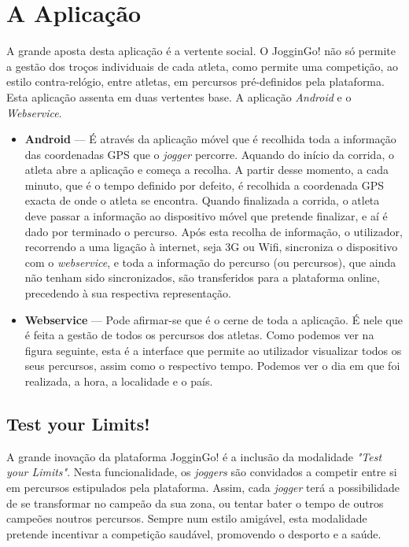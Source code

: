 \documentclass[twocolumn,twoside,10pt,a4paper]{article}
\begin{document}
\section{A Aplicação}\label{sec:application}

A grande aposta desta aplicação é a vertente social. O JogginGo! não só permite a gestão dos troços individuais de cada atleta, como permite uma competição, ao estilo contra-relógio, entre atletas, em percursos pré-definidos pela plataforma.
Esta aplicação assenta em duas vertentes base. A aplicação \textit{Android} e o \textit{Webservice}.
\begin{itemize}
\item \textbf{Android} --- É através da aplicação móvel que é recolhida toda a informação das coordenadas GPS que o \textit{jogger} percorre. Aquando do início da corrida, o atleta abre a aplicação e começa a recolha. A partir desse momento, a cada minuto, que é o tempo definido por defeito, é recolhida a coordenada GPS exacta de onde o atleta se encontra. Quando finalizada a corrida, o atleta deve passar a informação ao dispositivo móvel que pretende finalizar, e aí é dado por terminado o percurso. Após esta recolha de informação, o utilizador, recorrendo a uma ligação à internet, seja 3G ou Wifi, sincroniza o dispositivo com o \textit{webservice}, e toda a informação do percurso (ou percursos), que ainda não tenham sido sincronizados, são transferidos para a plataforma online, precedendo à sua respectiva representação.
\item \textbf{Webservice} --- Pode afirmar-se que é o cerne de toda a aplicação. É nele que é feita a gestão de todos os percursos dos atletas. Como podemos ver na figura seguinte, esta é a interface que permite ao utilizador visualizar todos os seus percursos, assim como o respectivo tempo. Podemos ver o dia em que foi realizada, a hora, a localidade e o país.
\end{itemize}

\subsection{Test your Limits!}
A grande inovação da plataforma JogginGo! é a inclusão da modalidade \textit{"Test your Limits"}. Nesta funcionalidade, os \textit{joggers} são convidados a competir entre si em percursos estipulados pela plataforma. Assim, cada \textit{jogger} terá a possibilidade de se transformar no campeão da sua zona, ou tentar bater o tempo de outros campeões noutros percursos. Sempre num estilo amigável, esta modalidade pretende incentivar a competição saudável, promovendo o desporto e a saúde.
\end{document}
